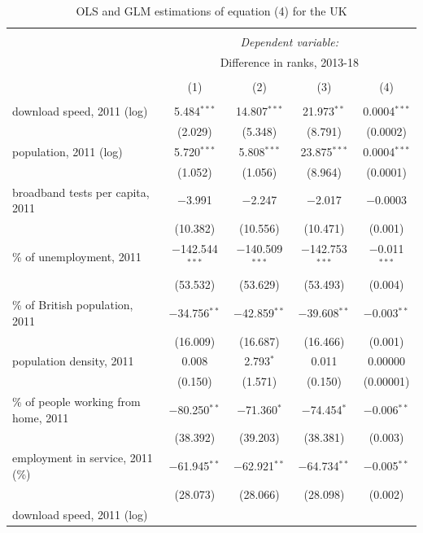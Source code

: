 \documentclass[10pt,letterpaper]{article}
\begin{document}
\begin{table}[!htbp] \centering 
  \caption{OLS and GLM estimations of equation (4) for the UK\label{ols.uk}} 
  \label{} 
\small 
\begin{tabular}{@{\extracolsep{1pt}}lcccc} 
\\[-1.8ex]\hline 
\hline \\[-1.8ex] 
 & \multicolumn{4}{c}{\textit{Dependent variable:}} \\ 
\cline{2-5} 
 & \multicolumn{4}{c}{Difference in ranks, 2013-18} \\ 
\\[-1.8ex] & (1) & (2) & (3) & (4)\\ 
\hline \\[-1.8ex] 
 download speed, 2011 (log) & 5.484$^{***}$ & 14.807$^{***}$ & 21.973$^{**}$ & 0.0004$^{***}$ \\ 
  & (2.029) & (5.348) & (8.791) & (0.0002) \\ 
  population, 2011 (log) & 5.720$^{***}$ & 5.808$^{***}$ & 23.875$^{***}$ & 0.0004$^{***}$ \\ 
  & (1.052) & (1.056) & (8.964) & (0.0001) \\ 
  broadband tests per capita, 2011 & $-$3.991 & $-$2.247 & $-$2.017 & $-$0.0003 \\ 
  & (10.382) & (10.556) & (10.471) & (0.001) \\ 
  \% of unemployment, 2011 & $-$142.544$^{***}$ & $-$140.509$^{***}$ & $-$142.753$^{***}$ & $-$0.011$^{***}$ \\ 
  & (53.532) & (53.629) & (53.493) & (0.004) \\ 
  \% of British population, 2011 & $-$34.756$^{**}$ & $-$42.859$^{**}$ & $-$39.608$^{**}$ & $-$0.003$^{**}$ \\ 
  & (16.009) & (16.687) & (16.466) & (0.001) \\ 
  population density, 2011 & 0.008 & 2.793$^{*}$ & 0.011 & 0.00000 \\ 
  & (0.150) & (1.571) & (0.150) & (0.00001) \\ 
  \% of people working from home, 2011 & $-$80.250$^{**}$ & $-$71.360$^{*}$ & $-$74.454$^{*}$ & $-$0.006$^{**}$ \\ 
  & (38.392) & (39.203) & (38.381) & (0.003) \\ 
  employment in service, 2011 (\%) & $-$61.945$^{**}$ & $-$62.921$^{**}$ & $-$64.734$^{**}$ & $-$0.005$^{**}$ \\ 
  & (28.073) & (28.066) & (28.098) & (0.002) \\ 
  download speed, 2011 (log) \\

\end{tabular}
\end{table}
\end{document}

